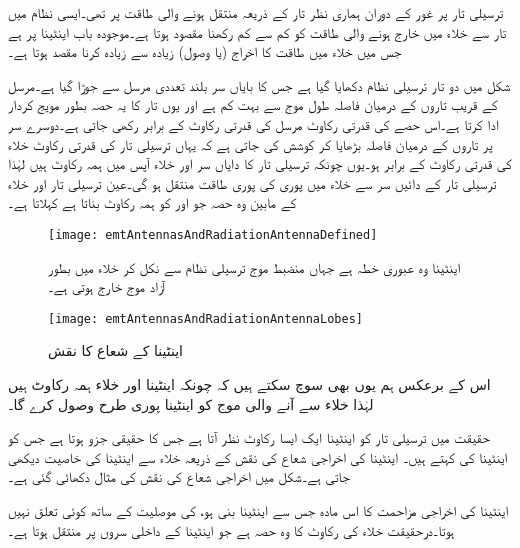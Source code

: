 
ترسیلی تار پر غور کے دوران ہماری نظر تار کے ذریعہ منتقل ہونے والی طاقت پر تھی۔ایسی نظام میں تار سے خلاء میں خارج ہونے والی طاقت کو کم سے کم رکھنا مقصود ہوتا ہے۔موجودہ باب  اینٹینا پر ہے جس میں خلاء میں طاقت کا اخراج (یا وصول) زیادہ سے زیادہ کرنا مقصد ہوتا ہے۔

شکل  میں دو تار ترسیلی نظام دکھایا گیا ہے جس کا بایاں سر  بلند تعددی مرسل سے جوڑا گیا ہے۔مرسل کے قریب تاروں کے درمیان فاصلہ طول موج   سے بہت کم ہے اور یوں تار کا یہ حصہ بطور مویج کردار ادا کرتا ہے۔اس حصے کی قدرتی رکاوٹ مرسل کی قدرتی رکاوٹ  کے برابر رکھی جاتی ہے۔دوسرے سر پر تاروں کے درمیان فاصلہ  بڑھایا کر کوشش کی جاتی ہے کہ یہاں ترسیلی تار کی قدرتی رکاوٹ خلاء کی قدرتی رکاوٹ  کے برابر ہو۔یوں چونکہ ترسیلی تار کا دایاں سر اور خلاء آپس میں ہمہ رکاوٹ ہیں لہٰذا ترسیلی تار کے دائیں سر سے خلاء میں پوری کی پوری طاقت منتقل ہو گی۔عین ترسیلی تار اور خلاء کے مابین وہ حصہ جو  اور  کو ہمہ رکاوٹ بناتا ہے   کہلاتا ہے۔
\begin{figure}
\centering
\texttt{[image: emtAntennasAndRadiationAntennaDefined]}
\caption{اینٹینا وہ عبوری خطہ ہے جہاں منضبط موج ترسیلی نظام سے نکل کر خلاء میں بطور آزاد موج خارج ہوتی ہے۔}
\label{شکل_اینٹینا_تعارف}
\end{figure}

\begin{figure}
\centering
\texttt{[image: emtAntennasAndRadiationAntennaLobes]}
\caption{اینٹینا کے شعاع کا نقش}
\label{شکل_اینٹینا_شعاع_نقش}
\end{figure}

اس کے برعکس ہم یوں بھی سوچ سکتے ہیں کہ چونکہ اینٹینا اور خلاء ہمہ رکاوٹ ہیں لہٰذا  خلاء سے آنے والی موج کو اینٹینا پوری طرح وصول کرے گا۔

حقیقت میں ترسیلی تار کو  اینٹینا ایک ایسا  رکاوٹ نظر آتا ہے جس کا حقیقی جزو  ہوتا ہے  جس کو اینٹینا کی  کہتے ہیں۔ اینٹینا کی اخراجی شعاع کی نقش  کے ذریعہ خلاء سے اینٹینا کی خاصیت دیکھی جاتی ہے۔شکل  میں اخراجی شعاع کی نقش کی مثال دکھائی گئی ہے۔

اینٹینا کی اخراجی مزاحمت  کا اس مادہ جس سے اینٹینا بنی ہو، کی موصلیت کے ساتھ کوئی تعلق نہیں ہوتا۔درحقیقت  خلاء کی رکاوٹ کا وہ حصہ ہے جو اینٹینا کے داخلی سروں پر منتقل ہوتا ہے۔

